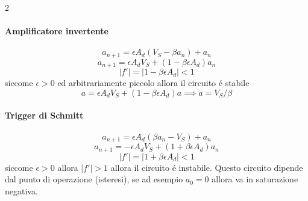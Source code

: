 \begin{multicols}{2}
  \paragraph{Amplificatore invertente}
  \begin{equation*}
    a_{n+1} = \epsilon A_d(V_S - \beta a_n) + a_n
  \end{equation*}
  \begin{equation*}
    a_{n+1} = \epsilon A_dV_S + (1 - \beta\epsilon A_d)a_n
  \end{equation*}
  \begin{equation*}
    |f'| = |1 - \beta\epsilon A_d| < 1
  \end{equation*}
  siccome $\epsilon > 0$ ed arbitrariamente piccolo allora il circuito \'e stabile
  \begin{equation*}
    a = \epsilon A_dV_S + (1 - \beta\epsilon A_d)a \implies a = V_S/\beta
  \end{equation*}

  \paragraph{Trigger di Schmitt}
  \begin{equation*}
    a_{n+1} = \epsilon A_d(\beta a_n - V_S) + a_n
  \end{equation*}
  \begin{equation*}
    a_{n+1} = -\epsilon A_dV_S + (1 + \beta\epsilon A_d)a_n
  \end{equation*}
  \begin{equation*}
    |f'| = |1 + \beta\epsilon A_d| < 1
  \end{equation*}
  siccome $\epsilon > 0$ allora $|f'| > 1$ allora il circuito \'e instabile.
  Questo circuito dipende dal punto di operazione (isteresi), se ad esempio
  $a_0 = 0$ allora va in saturazione negativa.
\end{multicols}
